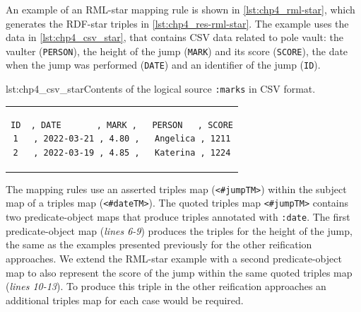 An example of an \mbox{RML-star} mapping rule is shown in \cref{lst:chp4_rml-star}, which generates the \mbox{RDF-star} triples in \cref{lst:chp4_res-rml-star}.
The example uses the data in \cref{lst:chp4_csv_star}, that contains CSV data related to pole vault:
the vaulter (\texttt{PERSON}),
the height of the jump (\texttt{MARK}) and its score (\texttt{SCORE}),
the date when the jump was performed (\texttt{DATE}) and
an identifier of the jump (\texttt{ID}).

\noindent\hspace{0.15\linewidth}\begin{minipage}{\linewidth}
\begin{captionedlisting}{lst:chp4_csv_star}{Contents of the logical source \texttt{:marks} in CSV format.}
\centering
\begin{tabular}{c}
\hspace{3em}
{\begin{lstlisting}[basicstyle=\ttfamily\small,label={list:example1},columns=flexible]
ID  , DATE       , MARK ,   PERSON   , SCORE
1   , 2022-03-21 , 4.80 ,   Angelica , 1211
2   , 2022-03-19 , 4.85 ,   Katerina , 1224
\end{lstlisting}}
\end{tabular}
\end{captionedlisting}
\end{minipage}

The mapping rules use an asserted triples map (\texttt{<\#jumpTM>}) within the subject map of a triples map (\texttt{<\#dateTM>}). The quoted triples map \texttt{<\#jumpTM>} contains two predicate-object maps that produce triples annotated with \texttt{:date}. The first predicate-object map (\textit{lines 6-9}) produces the triples for the height of the jump, the same as the examples presented previously for the other reification approaches. We extend the RML-star example with a second predicate-object map to also represent the score of the jump within the same quoted triples map (\textit{lines 10-13}). To produce this triple in the other reification approaches an additional triples map for each case would be required.




